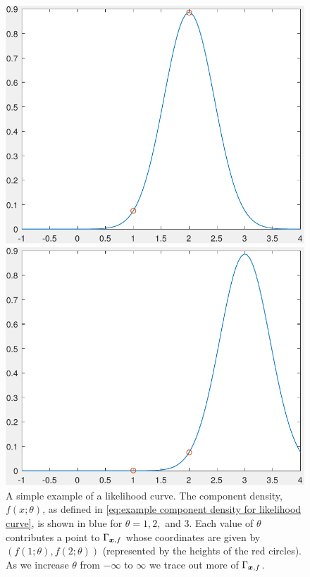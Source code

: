 \begin{figure}[ht]
\begin{minipage}[b]{0.32\linewidth}
			\end{minipage}
			\begin{minipage}[b]{0.32\linewidth}
				\includegraphics[width=\textwidth]{GammaTraceDensity02}
			\end{minipage}
			\begin{minipage}[b]{0.32\linewidth}
				\includegraphics[width=\textwidth]{GammaTraceDensity03}
			\end{minipage}
			\caption[A simple example of a likelihood curve.]{A simple example of a likelihood curve. The component density, $f(x;\theta)$, as defined in \eqref{eq:example component density for likelihood curve}, is shown in blue for $\theta = 1,2,$ and $3$. Each value of $\theta$ contributes a point to $\Gamma_{{\bm{{x}}}, f}$ whose coordinates are given by $(f(1;\theta),f(2;\theta))$ (represented by the heights of the red circles). As we increase $\theta$ from $-\infty$ to $\infty$ we trace out more of $\Gamma_{{\bm{{x}}}, f}$.}\label{fig:TracingGamma}
		\end{figure}

